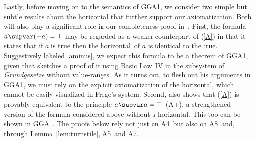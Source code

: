 \documentclass{preprint}
\newcommand{\GGA}{\textsf{GGA1}}
\newcommand{\iv}{A4}%
\newcommand{\ahor}{A5}%
\newcommand{\aimp}{A7}%
\newcommand{\aquant}{A8}%
\renewcommand{\to}{\supvar}
\begin{document}
Lastly, before moving on to the semantics of \GGA, we consider two simple but subtle results about the horizontal that further support our axiomatization. Both will also play a significant role in our completeness proof in~. 
First, the formula $a \to (- a) = \top$ may be regarded as a weaker counterpart of (\ref{A}) in that it states that if $a$ is true then the horizontal~of $a$ is identical to the true. 
Suggestively labeled \eqref{aminus}, we expect this formula to be a theorem of \GGA, given that \citet[p.~352]{landini2022stipulations} sketches a proof of it using Basic Law~IV in the subsystem of \textit{Grundgesetze} without value-ranges. As it turns out, to flesh out his arguments in \GGA, we must rely on the explicit axiomatization of the horizontal, which cannot be easily visualized in Frege's system. 
Second, \citet[\S4]{landini2022stipulations} also shows that (\ref{A}) is provably equivalent to the principle $a \to a = \top$~(A+), a strengthened version of the formula considered above without a horizontal. This too can be shown in \GGA.  
The proofs below rely not just on \iv~but also on \aquant~and, through Lemma~\ref{lem:turnstile}, \ahor~and \aimp. 
\end{document}
